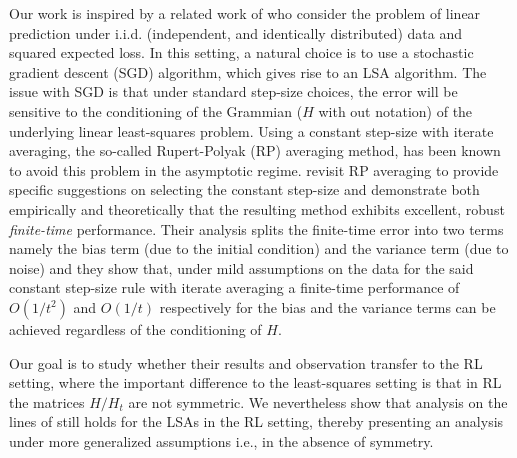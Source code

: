 Our work is inspired by a related work of \cite{bachaistats} who consider the problem of linear prediction under i.i.d. (independent, and identically distributed) data and squared expected loss. In this setting, a natural choice is to use a stochastic gradient descent (SGD) algorithm, which gives rise to an LSA algorithm. The issue with SGD is that under standard step-size choices, the error will be sensitive to the conditioning of the Grammian ($H$ with out notation) of the underlying linear least-squares problem. Using a constant step-size with iterate averaging, the so-called Rupert-Polyak (RP) averaging method, has been known to avoid this problem in the asymptotic regime.  \cite{bachaistats} revisit RP averaging to provide specific suggestions on selecting the constant step-size and demonstrate both empirically   and theoretically that the resulting method exhibits excellent, robust \emph{finite-time} performance. Their analysis splits the finite-time error into two terms namely the bias term (due to the initial condition) and the variance term (due to noise) and they show that, under mild assumptions on the data for the said constant step-size rule with iterate averaging a finite-time performance of $O(1/t^2)$ and $O(1/t)$ respectively for the bias and the variance terms can be achieved regardless of the conditioning of $H$.  

Our goal is to study whether their results and observation transfer to the RL setting, where the important difference to the least-squares setting is that in RL the matrices $H/H_t$ are not symmetric. We nevertheless show that analysis on the lines of \cite{bachaistats} still holds for the LSAs in the RL setting, thereby presenting an analysis under more generalized assumptions i.e., in the absence of symmetry. 

